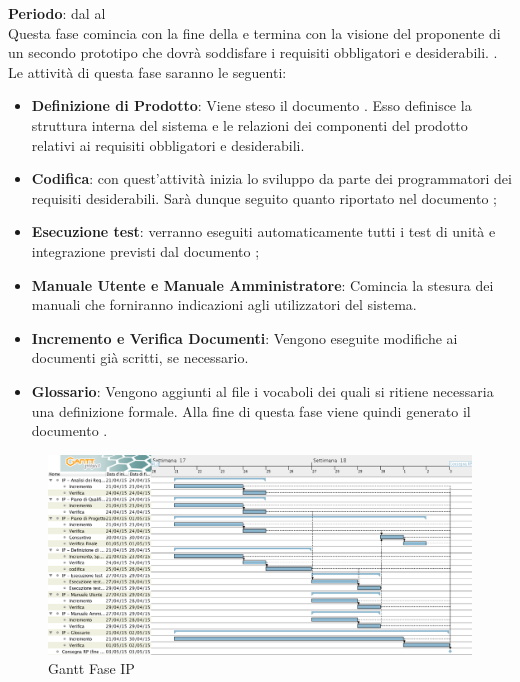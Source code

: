 	\textbf{Periodo}: dal  al  \\Questa fase comincia con la fine della  e termina con la visione del proponente di un secondo prototipo che dovrà soddisfare i requisiti obbligatori e desiderabili. .\\Le attività di questa fase saranno le seguenti:
	\begin{itemize}
		\item\textbf{Definizione di Prodotto}: Viene steso il documento . Esso definisce la struttura interna del sistema e le relazioni dei componenti del prodotto relativi ai requisiti obbligatori e desiderabili.
		\item \textbf{Codifica}: con quest'attività inizia lo sviluppo da parte dei programmatori dei requisiti desiderabili. Sarà dunque seguito quanto riportato nel documento ;
		\item \textbf{Esecuzione test}: verranno eseguiti automaticamente tutti i test di unità e integrazione previsti dal documento ;
		\item\textbf{Manuale Utente e Manuale Amministratore}: Comincia la stesura dei manuali che forniranno indicazioni agli utilizzatori del sistema.
		\item\textbf{Incremento e Verifica Documenti}: Vengono eseguite modifiche ai documenti già scritti, se necessario.
		\item\textbf{Glossario}: Vengono aggiunti al file  i vocaboli dei quali si ritiene necessaria una definizione formale. Alla fine di questa fase viene quindi generato il documento .
	\end{itemize}
	\begin{figure}[H]\centering
		\includegraphics[width=\textwidth]{PianoDiProgetto/Pics/FaseIP.png}
	\caption{Gantt Fase IP}
\end{figure}
